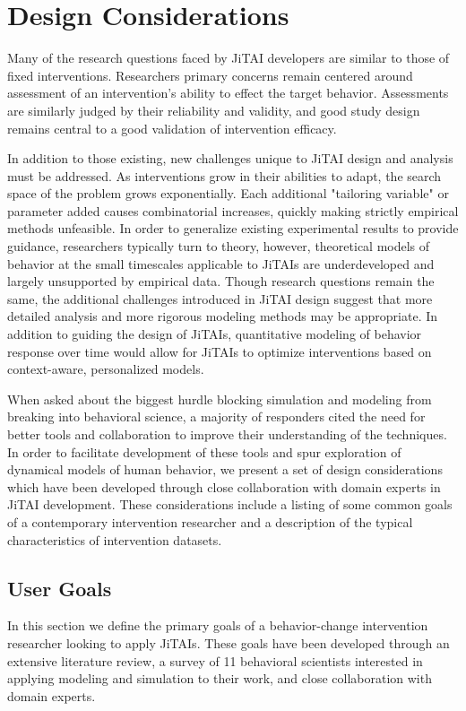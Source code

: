 \section{Design Considerations}
Many of the research questions faced by JiTAI developers are similar to those of fixed interventions. 
Researchers primary concerns remain centered around assessment of an intervention's ability to effect the target behavior.
Assessments are similarly judged by their reliability and validity, and good study design remains central to a good validation of intervention efficacy.

In addition to those existing, new challenges unique to JiTAI design and analysis must be addressed.
As interventions grow in their abilities to adapt, the search space of the problem grows exponentially.
Each additional "tailoring variable" or parameter added causes combinatorial increases, quickly making strictly empirical methods unfeasible.
In order to generalize existing experimental results to provide guidance, researchers typically turn to theory, however, theoretical models of behavior at the small timescales applicable to JiTAIs are underdeveloped and largely unsupported by empirical data. 
Though research questions remain the same, the additional challenges introduced in JiTAI design suggest that more detailed analysis and more rigorous modeling methods may be appropriate.
In addition to guiding the design of JiTAIs, quantitative modeling of behavior response over time would allow for JiTAIs to optimize interventions based on context-aware, personalized models.

When asked about the biggest hurdle blocking simulation and modeling from breaking into behavioral science, a majority of responders cited the need for better tools and collaboration to improve their understanding of the techniques.
In order to facilitate development of these tools and spur exploration of dynamical models of human behavior, we present a set of design considerations which have been developed through close collaboration with domain experts in JiTAI development.
These considerations include a listing of some common goals of a contemporary intervention researcher and a description of the typical characteristics of intervention datasets. 

\subsection{User Goals}
In this section we define the primary goals of a behavior-change intervention researcher looking to apply JiTAIs.
These goals have been developed through an extensive literature review, a survey of 11 behavioral scientists interested in applying modeling and simulation to their work, and close collaboration with domain experts.


